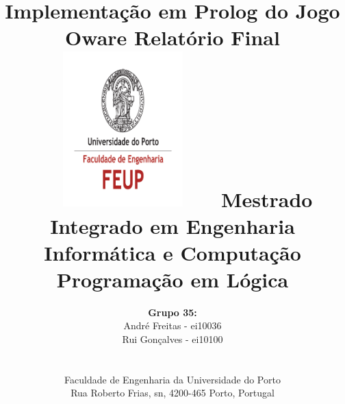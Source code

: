 \documentclass[15pt,a4paper]{article}
\begin{document}
\setlength{\textwidth}{16cm}
\setlength{\textheight}{22cm}

\title{\Huge\textbf{Implementação em Prolog do Jogo Oware}\linebreak\linebreak\linebreak
\Large\textbf{Relatório Final}\linebreak\linebreak
\includegraphics[height=6cm, width=7cm]{feup.pdf}\linebreak \linebreak
\Large{Mestrado Integrado em Engenharia Informática e Computação} \linebreak \linebreak
\Large{Programação em Lógica}\linebreak
}

\author{\textbf{Grupo 35:}\\ André Freitas - ei10036 \\ Rui Gonçalves - ei10100 \\\linebreak\linebreak \\
 \\ Faculdade de Engenharia da Universidade do Porto \\ Rua Roberto Frias, s\/n, 4200-465 Porto, Portugal \linebreak\linebreak\linebreak
\linebreak\linebreak\vspace{1cm}}
\maketitle
\thispagestyle{empty}
\newpage
\end{document}
